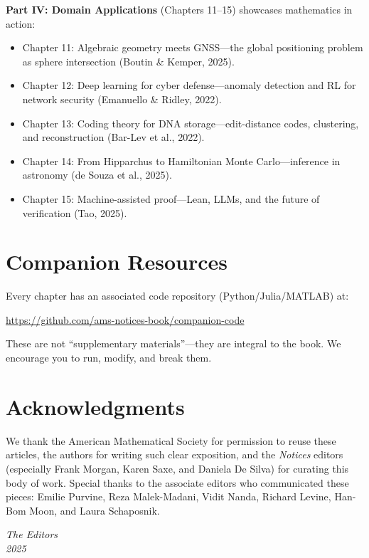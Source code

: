 \medskip
\noindent\textbf{Part IV: Domain Applications} (Chapters 11--15) showcases mathematics in action:
\begin{itemize}
    \item Chapter 11: Algebraic geometry meets GNSS---the global positioning problem as sphere intersection (Boutin \& Kemper, 2025).
    \item Chapter 12: Deep learning for cyber defense---anomaly detection and RL for network security (Emanuello \& Ridley, 2022).
    \item Chapter 13: Coding theory for DNA storage---edit-distance codes, clustering, and reconstruction (Bar-Lev et al., 2022).
    \item Chapter 14: From Hipparchus to Hamiltonian Monte Carlo---inference in astronomy (de Souza et al., 2025).
    \item Chapter 15: Machine-assisted proof---Lean, LLMs, and the future of verification (Tao, 2025).
\end{itemize}

\section*{Companion Resources}

Every chapter has an associated code repository (Python/Julia/MATLAB) at:
\begin{center}
    \url{https://github.com/ams-notices-book/companion-code}
\end{center}
These are not ``supplementary materials''---they are integral to the book. We encourage you to run, modify, and break them.

\section*{Acknowledgments}

We thank the American Mathematical Society for permission to reuse these articles, the authors for writing such clear exposition, and the \textit{Notices} editors (especially Frank Morgan, Karen Saxe, and Daniela De Silva) for curating this body of work. Special thanks to the associate editors who communicated these pieces: Emilie Purvine, Reza Malek-Madani, Vidit Nanda, Richard Levine, Han-Bom Moon, and Laura Schaposnik.

\vspace{1cm}
\noindent\textit{The Editors}\\
\textit{2025}